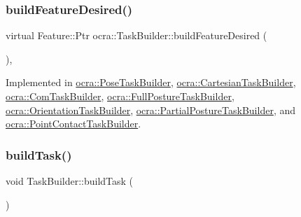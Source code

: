 \hypertarget{classocra_1_1TaskBuilder_a7a2c8bcc5d95160d0e48806a2648f1a5}{}\label{classocra_1_1TaskBuilder_a7a2c8bcc5d95160d0e48806a2648f1a5} 
\subsubsection{\texorpdfstring{build\+Feature\+Desired()}{buildFeatureDesired()}}
{\footnotesize\ttfamily virtual Feature\+::\+Ptr ocra\+::\+Task\+Builder\+::build\+Feature\+Desired (\begin{DoxyParamCaption}{ }\end{DoxyParamCaption})\hspace{0.3cm}{\ttfamily [protected]}, {}}



Implemented in \hyperlink{classocra_1_1PoseTaskBuilder_a66fa4cdba48138741e19e642684a7006}{ocra\+::\+Pose\+Task\+Builder}, \hyperlink{classocra_1_1CartesianTaskBuilder_a308b204435c4063991d8101c0a8c512c}{ocra\+::\+Cartesian\+Task\+Builder}, \hyperlink{classocra_1_1ComTaskBuilder_abdd4c74539a37ff4c719c0ac78812bf4}{ocra\+::\+Com\+Task\+Builder}, \hyperlink{classocra_1_1FullPostureTaskBuilder_ac9ea83ee3f872995c6dc214e91fc28a0}{ocra\+::\+Full\+Posture\+Task\+Builder}, \hyperlink{classocra_1_1OrientationTaskBuilder_af5f11bdd9c43cb52e29054c6b293d533}{ocra\+::\+Orientation\+Task\+Builder}, \hyperlink{classocra_1_1PartialPostureTaskBuilder_a1a853459b32e838d04205459c608f5b2}{ocra\+::\+Partial\+Posture\+Task\+Builder}, and \hyperlink{classocra_1_1PointContactTaskBuilder_a253f8fffbd548b63badee23e2c42eb95}{ocra\+::\+Point\+Contact\+Task\+Builder}.

\hypertarget{classocra_1_1TaskBuilder_a84109a9bca0da0b2f7220b183e7d032d}{}\label{classocra_1_1TaskBuilder_a84109a9bca0da0b2f7220b183e7d032d} 
\subsubsection{\texorpdfstring{build\+Task()}{buildTask()}}
{\footnotesize\ttfamily void Task\+Builder\+::build\+Task (\begin{DoxyParamCaption}{ }\end{DoxyParamCaption})}

